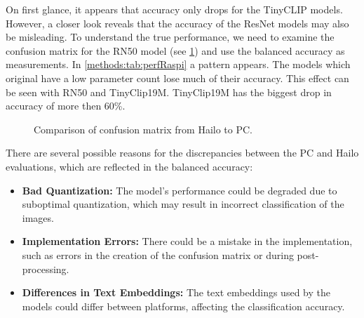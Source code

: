 On first glance, it appears that accuracy only drops for the TinyCLIP models.
However, a closer look reveals that the accuracy of the ResNet models may also be misleading.
To understand the true performance, we need to examine the confusion matrix for the RN50 model (see \cref{methods:fig:compareConfM}) and use the balanced accuracy as measurements.
In \cref{methods:tab:perfRaspi} a pattern appears.
The models which original have a low parameter count lose much of their accuracy.
This effect can be seen with RN50 and TinyClip19M.
TinyClip19M has the biggest drop in accuracy of more then 60\%.


\begin{figure}[!h]
    \centering
    \label{methods:fig:compareConfM}
    \caption{Comparison of confusion matrix from Hailo to PC.}
\end{figure}

There are several possible reasons for the discrepancies between the PC and Hailo evaluations, which are reflected in the balanced accuracy:
\begin{itemize}
    \item \textbf{Bad Quantization:} The model's performance could be degraded due to suboptimal quantization, which may result in incorrect classification of the images.
    \item \textbf{Implementation Errors:} There could be a mistake in the implementation, such as errors in the creation of the confusion matrix or during post-processing.
    \item \textbf{Differences in Text Embeddings:} The text embeddings used by the models could differ between platforms, affecting the classification accuracy.
\end{itemize}


